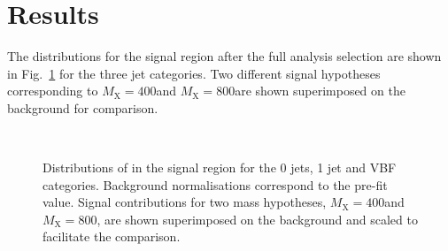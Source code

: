 \section{Results}\label{chap6:Results}

The \mti{} distributions for the signal region after the full analysis selection
are shown in Fig.~\ref{fig:13TeVmTishapes} for the three jet categories.
 Two different signal hypotheses corresponding to $M_\mathrm{X} = 400$\GeV and
 $M_\mathrm{X} = 800$\GeV are shown superimposed on the background for comparison.

\begin{figure}[!htb]
\centering
{}
\\
\caption{
    Distributions of \mti{} in the signal region for the 0 jets, 1 jet and VBF categories. Background normalisations correspond to the pre-fit value. Signal contributions for two mass hypotheses, $M_\mathrm{X} = 400$\GeV and $M_\mathrm{X} = 800$\GeV, are shown superimposed on the background and scaled to facilitate the comparison.}
    \label{fig:13TeVmTishapes}
\end{figure}

